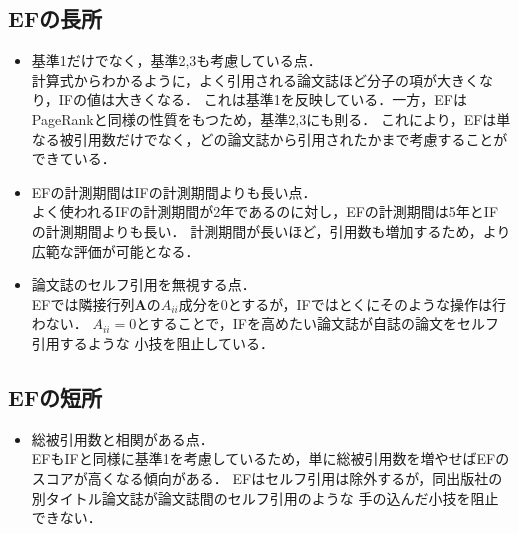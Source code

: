\subsection{EFの長所~\cite{Massimo2010}}
\begin{itemize}
    \item 基準1だけでなく，基準2,3も考慮している点．\\
    計算式からわかるように，よく引用される論文誌ほど分子の項が大きくなり，IFの値は大きくなる．
    これは基準1を反映している．一方，EFはPageRankと同様の性質をもつため，基準2,3にも則る．
    これにより，EFは単なる被引用数だけでなく，どの論文誌から引用されたかまで考慮することができている．
    \item EFの計測期間はIFの計測期間よりも長い点． \\
    よく使われるIFの計測期間が2年であるのに対し，EFの計測期間は5年とIFの計測期間よりも長い．
    計測期間が長いほど，引用数も増加するため，より広範な評価が可能となる．
    \item 論文誌のセルフ引用を無視する点． \\
    EFでは隣接行列$\bm{A}$の$A_{ii}$成分を0とするが，IFではとくにそのような操作は行わない．
    $A_{ii}=0$とすることで，IFを高めたい論文誌が自誌の論文をセルフ引用するような
    小技を阻止している．
\end{itemize}

\subsection{EFの短所~\cite{Masuda2013}}
\begin{itemize}
    \item 総被引用数と相関がある点．\\
    EFもIFと同様に基準1を考慮しているため，単に総被引用数を増やせばEFのスコアが高くなる傾向がある．
    EFはセルフ引用は除外するが，同出版社の別タイトル論文誌が論文誌間のセルフ引用のような
    手の込んだ小技を阻止できない．
\end{itemize}

